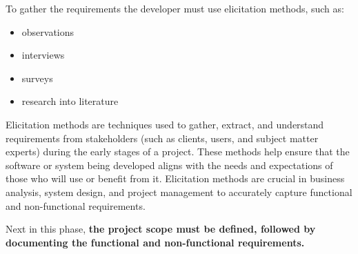 \documentclass[a4paper]{article}
\begin{document}
To gather the requirements the developer must use elicitation methods, such as: 
\begin{itemize}
    \item observations
    \item interviews
    \item surveys
    \item research into literature
\end{itemize}    

Elicitation methods are techniques used to gather, extract, and understand requirements from stakeholders 
(such as clients, users, and subject matter experts) during the early stages of a project. These methods 
help ensure that the software or system being developed aligns with the needs and expectations of those who will use or benefit from it.
Elicitation methods are crucial in business analysis, system design, and project management to accurately capture functional and 
non-functional requirements.

Next in this phase, \textbf{the project scope must be defined, followed by documenting the functional and non-functional requirements.}
\end{document}
